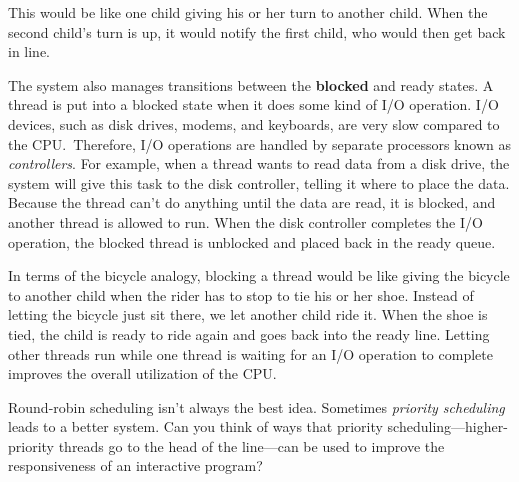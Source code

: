 This would be like one child giving his
or her turn to another child.  When the second child's turn is up, it
would notify the first child, who would then get back in line.

The system also manages transitions between the {\bf blocked} and
ready states.  A thread is put into a blocked state when it does some
kind of I/O operation.  I/O devices, such as disk drives, modems, and
keyboards, are very slow compared to the CPU.~Therefore, I/O
operations are handled by separate processors known as {\it
controllers}. For example, when a thread wants to read data from a
disk drive, the system will give this task to the disk controller,
telling it where to place the data.  Because the thread can't do anything
until the data are read, it is blocked, and another thread is allowed
to run.   When the disk controller completes the I/O operation, the
blocked thread is unblocked and placed back in the ready queue.

In terms of the bicycle analogy, blocking a thread would be like
giving the bicycle to another child when the rider has to stop to tie
his or her shoe.  Instead of letting the bicycle just sit there, we let
another child ride it.  When the shoe is tied, the child is ready to
ride again and goes back into the ready line.  Letting other threads
run while one thread is waiting for an I/O operation to complete
improves the overall utilization of the CPU.

\label{self-study-exercise}
\begin{SSTUDY}

\item  Round-robin scheduling isn't always the best idea.  Sometimes
{\it priority scheduling} leads to a better system.  Can you
think of ways that priority scheduling---higher-priority
threads go to the head of the line---can be used to improve
the responsiveness of an interactive \mbox{program?}
\end{SSTUDY}




